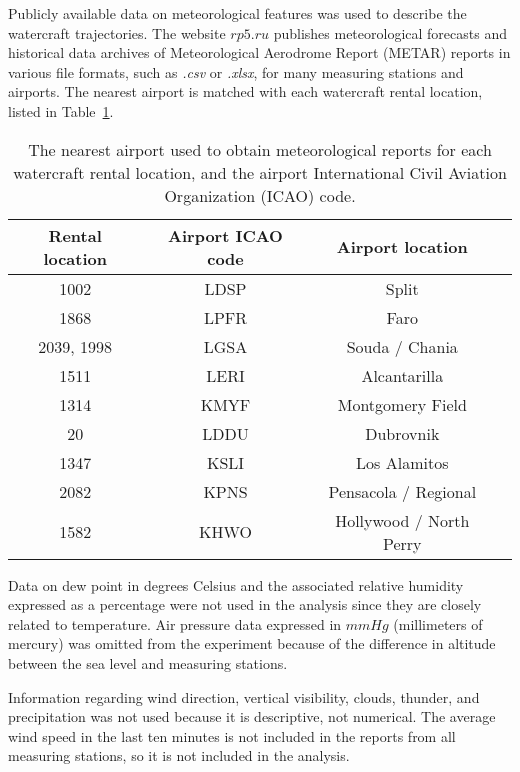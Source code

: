 \documentclass[preprint,12pt]{elsarticle}
\begin{document}
Publicly available data on meteorological features was used to describe the watercraft trajectories. The website $rp5.ru$ \cite{rp5WeatherArchive, rp5Description} publishes meteorological forecasts and historical data archives of Meteorological Aerodrome Report (METAR) reports in various file formats, such as \textit{.csv} or \textit{.xlsx}, for many measuring stations and airports. The nearest airport is matched with each watercraft rental location, listed in Table~\ref{tab:airport}.

\begin{table}[!ht]
    \centering
    \begin{tabular}{|c|c|c|c|}
        \hline
        Rental location & Airport ICAO code & Airport location \\ \hline
        1002 & LDSP & Split \\ \hline
        1868 & LPFR & Faro \\ \hline 
        2039, 1998 & LGSA & Souda / Chania \\ \hline
        1511 & LERI & Alcantarilla \\ \hline
        1314 & KMYF & Montgomery Field \\ \hline
        20 & LDDU & Dubrovnik \\ \hline
        1347 & KSLI & Los Alamitos \\ \hline
        2082 & KPNS & Pensacola / Regional \\ \hline
        1582 & KHWO & Hollywood / North Perry \\ \hline
    \end{tabular}
    \caption{The nearest airport used to obtain meteorological reports for each watercraft rental location, and the airport International Civil Aviation Organization (ICAO) code.}
    \label{tab:airport}
\end{table}

Data on dew point in degrees Celsius and the associated relative humidity expressed as a percentage were not used in the analysis since they are closely related to temperature. Air pressure data expressed in $mmHg$ (millimeters of mercury) was omitted from the experiment because of the difference in altitude between the sea level and measuring stations.

Information regarding wind direction, vertical visibility, clouds, thunder, and precipitation was not used because it is descriptive, not numerical. The average wind speed in the last ten minutes is not included in the reports from all measuring stations, so it is not included in the analysis.
\end{document}
